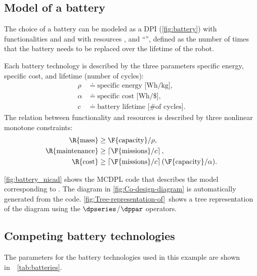 \subsection{Model of a battery}

The choice of a battery can be modeled as a DPI (\cref{fig:battery})
with functionalities  and 
and with resources ,  and ``'',
defined as the number of times that the battery needs to be replaced
over the lifetime of the robot.

Each battery technology is described by the three parameters specific
energy, specific cost, and lifetime (number of cycles):
\begin{align*}
    \rho & \doteq\text{specific energy [Wh/kg]},\\
    \alpha & \doteq\text{specific cost [Wh/\$]},\\
    c & \doteq\text{battery lifetime [\# of cycles]}.
\end{align*}
The relation between functionality and resources is described by three
nonlinear monotone constraints:
\begin{align}
    \R{\text{mass}} & \geq\F{\text{capacity}}/\rho,\label{eq:mass}\\
    \R{\text{maintenance}} & \geq\left\lceil \F{\text{missions}}/c\right\rceil ,\label{eq:maintenance}\\
    \R{\text{cost}} & \geq\left\lceil \F{\text{missions}}/c\right\rceil (\F{\text{capacity}}/\alpha).\label{eq:cost}
\end{align}

\cref{fig:battery_nicad} shows the MCDPL code that describes the
model corresponding to .
The diagram in \cref{fig:Co-design-diagram} is automatically generated
from the code. \cref{fig:Tree-representation-of}~shows a tree representation
of the diagram using the $\dpseries$/$\dppar$ operators.

\subsection{Competing battery technologies}

The parameters for the battery technologies used in this example are
shown in~~\cref{tab:batteries}.

